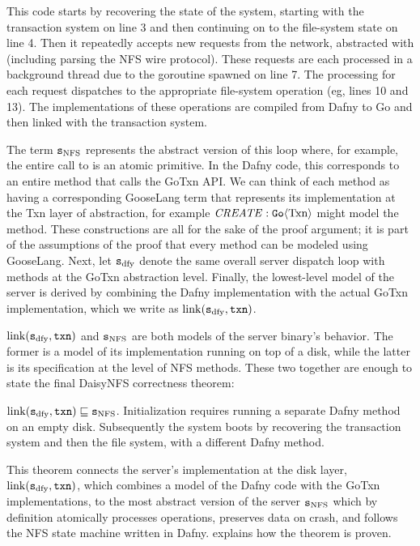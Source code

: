 This code starts by recovering the state of the system, starting with the
transaction system on line 3 and then continuing on to the file-system state on
line 4. Then it repeatedly accepts new requests from the network, abstracted
with  (including parsing the NFS wire protocol). These requests
are each processed in a background thread due to the goroutine spawned on line
7. The processing for each request dispatches to the appropriate file-system
operation (eg, lines 10 and 13). The implementations of these operations are
compiled from Dafny to Go and then linked with the transaction system.

The term $\texttt{s}_{\mathrm{NFS}}$ represents the abstract version of this loop where, for example,
the entire call to  is an atomic primitive. In the Dafny code,
this corresponds to an entire method that calls the GoTxn API. We can think of
each method as having a corresponding GooseLang term that represents its
implementation at the Txn layer of abstraction, for example
$\mathit{CREATE} : \mathtt{Go}\langle \mathrm{Txn} \rangle$ might model the  method.
These constructions are all for the sake of the proof argument; it is part of
the assumptions of the proof that every method can be modeled using GooseLang.
Next, let $\texttt{s}_{\mathrm{dfy}}$ denote the same overall server dispatch loop with
methods at the GoTxn abstraction level. Finally, the lowest-level model of the
server is derived by combining the Dafny implementation with the actual GoTxn
implementation, which we write as $\mathrm{link}(\texttt{s}_{\mathrm{dfy}}, \texttt{txn})$.

$\mathrm{link}(\texttt{s}_{\mathrm{dfy}}, \texttt{txn})$ and $\texttt{s}_{\mathrm{NFS}}$ are both models of the  server binary's
behavior. The former is a model of its implementation running on top of a disk,
while the latter is its specification at the level of NFS methods. These two
together are enough to state the final DaisyNFS correctness theorem:
\begin{theorem}
  $\mathrm{link}(\texttt{s}_{\mathrm{dfy}}, \texttt{txn}) \sqsubseteq \texttt{s}_{\mathrm{NFS}}$. Initialization requires running a separate Dafny
  method on an empty disk. Subsequently the system boots by recovering the
  transaction system and then the file system, with a different Dafny method.
  \label{thm:correctness}
\end{theorem}

This theorem connects the server's implementation at the disk layer,
$\mathrm{link}(\texttt{s}_{\mathrm{dfy}}, \texttt{txn})$, which combines a model of the Dafny code with the GoTxn
implementations, to the most abstract version of the server $\texttt{s}_{\mathrm{NFS}}$ which by
definition atomically processes operations, preserves data on crash, and follows
the NFS state machine written in Dafny.  explains how the
theorem is proven.
